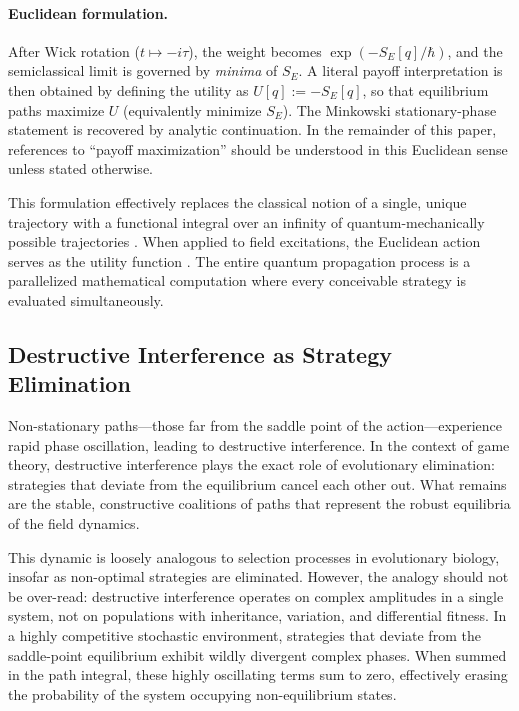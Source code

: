 \documentclass[12pt,a4paper]{article}
\theoremstyle{remark}
\begin{document}
\paragraph{Euclidean formulation.}
After Wick rotation ($t \mapsto -i\tau$), the weight becomes $\exp(-S_E[q]/\hbar)$, and the semiclassical limit is governed by \emph{minima} of $S_E$. A literal payoff interpretation is then obtained by defining the utility as $U[q] := -S_E[q]$, so that equilibrium paths maximize $U$ (equivalently minimize $S_E$). The Minkowski stationary-phase statement is recovered by analytic continuation. In the remainder of this paper, references to ``payoff maximization'' should be understood in this Euclidean sense unless stated otherwise.

This formulation effectively replaces the classical notion of a single, unique trajectory with a functional integral over an infinity of quantum-mechanically possible trajectories \citep{PathIntegral}. When applied to field excitations, the Euclidean action serves as the utility function \citep{PathIntegralOptimization}. The entire quantum propagation process is a parallelized mathematical computation where every conceivable strategy is evaluated simultaneously.

\subsection{Destructive Interference as Strategy Elimination}

Non-stationary paths---those far from the saddle point of the action---experience rapid phase oscillation, leading to destructive interference. In the context of game theory, destructive interference plays the exact role of evolutionary elimination: strategies that deviate from the equilibrium cancel each other out. What remains are the stable, constructive coalitions of paths that represent the robust equilibria of the field dynamics.

This dynamic is loosely analogous to selection processes in evolutionary biology, insofar as non-optimal strategies are eliminated. However, the analogy should not be over-read: destructive interference operates on complex amplitudes in a single system, not on populations with inheritance, variation, and differential fitness. In a highly competitive stochastic environment, strategies that deviate from the saddle-point equilibrium exhibit wildly divergent complex phases. When summed in the path integral, these highly oscillating terms sum to zero, effectively erasing the probability of the system occupying non-equilibrium states.
\end{document}
